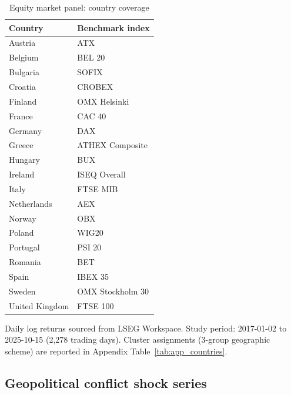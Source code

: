 \documentclass[11pt]{article}
\begin{document}
\begin{table}[ht]
\centering
\caption{Equity market panel: country coverage}
\label{tab:data_summary}
\begin{threeparttable}
\small
\begin{tabular}{ll}
\toprule
Country & Benchmark index \\
\midrule
Austria        & ATX               \\
Belgium        & BEL 20            \\
Bulgaria       & SOFIX             \\
Croatia        & CROBEX            \\
Finland        & OMX Helsinki      \\
France         & CAC 40            \\
Germany        & DAX               \\
Greece         & ATHEX Composite   \\
Hungary        & BUX               \\
Ireland        & ISEQ Overall      \\
Italy          & FTSE MIB          \\
Netherlands    & AEX               \\
Norway         & OBX               \\
Poland         & WIG20             \\
Portugal       & PSI 20            \\
Romania        & BET               \\
Spain          & IBEX 35           \\
Sweden         & OMX Stockholm 30  \\
United Kingdom & FTSE 100          \\
\bottomrule
\end{tabular}
\begin{tablenotes}
\small
\item Daily log returns sourced from LSEG Workspace.
      Study period: 2017-01-02 to 2025-10-15 (2,278 trading days).
      Cluster assignments (3-group geographic scheme) are reported in Appendix Table~\ref{tab:app_countries}.
\end{tablenotes}
\end{threeparttable}
\end{table}

\subsection{Geopolitical conflict shock series}
\label{subsec:shocks}
\end{document}
